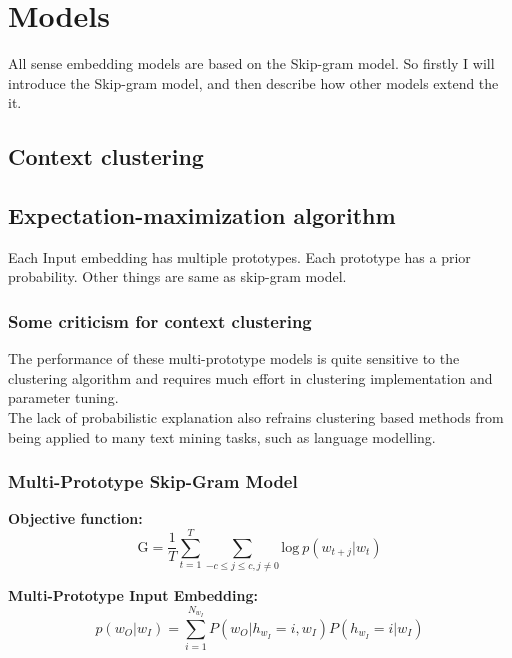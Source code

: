 \chapter{Models}
\label{cha:modeli}

All sense embedding models are based on the Skip-gram model. So firstly I will introduce the Skip-gram model, and then describe how other models extend the it. \\


\section{Context clustering}


\section{Expectation-maximization algorithm}

Each Input embedding has multiple prototypes. Each prototype has a prior probability. Other things are same as skip-gram model. \\

\subsection{Some criticism for context clustering}
The performance of these multi-prototype models is quite sensitive to the clustering algorithm and requires much effort in clustering implementation and parameter tuning.\\

The lack of probabilistic explanation also refrains clustering based methods from being applied to many text mining tasks, such as language modelling. 


\subsection{Multi-Prototype Skip-Gram Model}

\textbf{Objective function:}\\
$$\mathrm{G}=\frac{1}{T}\sum_{t=1}^T\sum_{-c\leq j\leq c,j\neq0}\mathrm{log}\ p(w_{t+j}|w_t)$$ 

\textbf{Multi-Prototype Input Embedding:}\\
$$p(w_O|w_I) = \sum_{i = 1}^{N_{w_I}}P(w_O|h_{w_I}=i,w_I)P(h_{w_I}=i|w_I)$$

